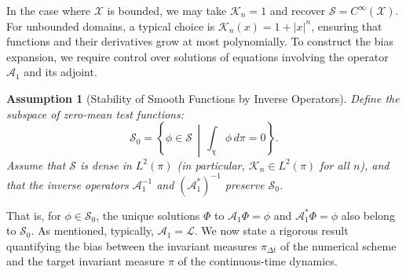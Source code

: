 \documentclass{article}
\newtheorem{assumption}[theorem]{Assumption}
\begin{document}
In the case where $\mathcal{X}$ is bounded, we may take $\mathcal{K}_n = 1$ and recover $\mathcal{S} = C^\infty(\mathcal{X})$. For unbounded domains, a typical choice is $\mathcal{K}_n(x) = 1 + |x|^n$, ensuring that functions and their derivatives grow at most polynomially. To construct the bias expansion, we require control over solutions of equations involving the operator $\mathcal{A}_1$ and its adjoint.
\begin{assumption}[Stability of Smooth Functions by Inverse Operators] \label{ass:inverse_stability}
Define the subspace of zero-mean test functions:
\[
\mathcal{S}_0 = \left\{ \phi \in \mathcal{S} \,\middle|\, \int_\chi \phi \, d\pi = 0 \right\}.
\]
Assume that $\mathcal{S}$ is dense in $L^2(\pi)$ (in particular, $\mathcal{K}_n \in L^2(\pi)$ for all $n$), and that the inverse operators $\mathcal{A}_1^{-1}$ and $(\mathcal{A}_1^*)^{-1}$ preserve $\mathcal{S}_0$.
\end{assumption}
That is, for $\phi \in \mathcal{S}_0$, the unique solutions $\Phi$ to $\mathcal{A}_1 \Phi = \phi$ and $\mathcal{A}_1^* \Phi = \phi$ also belong to $\mathcal{S}_0$. As mentioned, typically, $\mathcal{A}_1 = \mathcal{L}$. We now state a rigorous result quantifying the bias between the invariant measures $\pi_{\Delta t}$ of the numerical scheme and the target invariant measure $\pi$ of the continuous-time dynamics.
\end{document}
